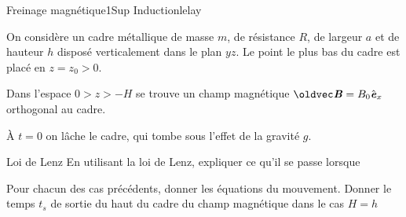 \begin{exercise}{Freinage magnétique}{1}{Sup}
{Induction}{lelay}

On considère un cadre métallique de masse $m$, de résistance $R$, de largeur $a$ et de hauteur $h$ disposé verticalement dans le plan $yz$. Le point le plus bas du cadre est placé en $z = z_0 > 0$.

Dans l'espace $0 > z > -H$ se trouve un champ magnétique $\vec{B} = B_0\ve_x$ orthogonal au cadre.

À $t=0$ on lâche le cadre, qui tombe sous l'effet de la gravité $g$.

\begin{questions}
    \questioncours Loi de Lenz
    \question En utilisant la loi de Lenz, expliquer ce qu'il se passe lorsque
    \question Pour chacun des cas précédents, donner les équations du mouvement. Donner le temps $t_s$ de sortie du haut du cadre du champ magnétique dans le cas $H = h$
\end{questions}

\end{exercise}
